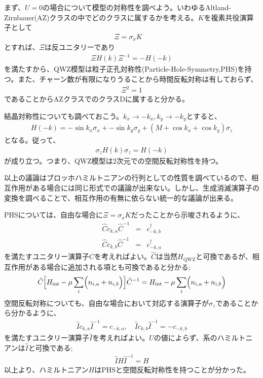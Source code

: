 \documentclass[12pt]{jsbook}
\begin{document}
まず、$U=0$の場合について模型の対称性を調べよう。いわゆるAltland-Zirnbauer(AZ)クラスの中でどのクラスに属するかを考える。$K$を複素共役演算子として
\begin{eqnarray}
\Xi = \sigma_x K\quad 
\end{eqnarray}
とすれば、$\Xi$は反ユニタリーであり
\begin{eqnarray}
\Xi H(k)\Xi^{-1} = -H(-k)
\end{eqnarray}
を満たすから、QWZ模型は粒子正孔対称性(Particle-Hole-Symmetry,PHS)を持つ。また、チャーン数が有限になりうることから時間反転対称は有しておらず、
\begin{eqnarray}
\Xi^2=1    
\end{eqnarray}
であることからAZクラスでのクラスDに属すると分かる。

結晶対称性についても調べておこう。$k_x\to-k_x, k_y\to-k_y$とすると、 
\begin{eqnarray}
H(-k) = -\sin k_x \sigma_x + -\sin k_y \sigma_y + (M+\cos k_x + \cos k_y)\sigma_z 
\end{eqnarray}となる。従って、 
\begin{eqnarray}
    \sigma_z H(k)\sigma_z = H(-k)
\end{eqnarray} 
が成り立つ。つまり、QWZ模型は2次元での空間反転対称性を持つ。

以上の議論はブロッホハミルトニアンの行列としての性質を調べているので、相互作用がある場合には同じ形式での議論が出来ない。しかし、生成消滅演算子の変換を調べることで、相互作用の有無に依らない統一的な議論が出来る\cite{PhysRevB.83.085426}。

PHSについては、自由な場合に$\Xi = \sigma_x K$だったことから示唆されるように、
\begin{eqnarray}
\hat{C}c_{k,a}\hat{C}^{-1} &=& c^{\dagger}_{-k,b}\\
\hat{C}c_{k,b}\hat{C}^{-1} &=& c^{\dagger}_{-k,a}
\end{eqnarray}
を満たすユニタリー演算子$\hat{C}$を考えればよい。$\hat{C}$は当然$H_{\mathrm{QWZ}}$と可換であるが、相互作用がある場合に追加される項とも可換であると分かる;
\begin{eqnarray}
\hat{C}\Bigl[H_{\mathrm{int}}-\mu \displaystyle \sum_i \Bigl(n_{i,a}+n_{i,b}\Bigr)\Bigr]\hat{C}^{-1}=H_{\mathrm{int}}-\mu \displaystyle \sum_i \Bigl(n_{i,a}+n_{i,b}\Bigr)
\end{eqnarray}
空間反転対称についても、自由な場合において対応する演算子が$\sigma_z$であることから分かるように、
\begin{eqnarray}
 \hat{I}c_{k,a}\hat{I}^{-1}=c_{-k,a},\quad \hat{I}c_{k,b}\hat{I}^{-1}=-c_{-k,b} 
\end{eqnarray}
 を満たすユニタリー演算子$\hat{I}$を考えればよい。$U$の値によらず、系のハミルトニアンは$\hat{I}$と可換である;
 \begin{eqnarray}
     \hat{I}H\hat{I}^{-1}=H
 \end{eqnarray}
 以上より、ハミルトニアン$H$はPHSと空間反転対称性を持つことが分かった。
\end{document}
